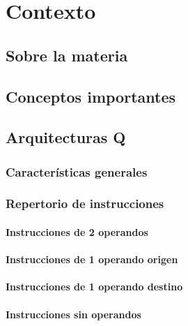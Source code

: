 \chapter{Contexto}
\section{Sobre la materia \orga}
\section{Conceptos importantes}

\section{Arquitecturas Q}

\subsection{Características generales} \label{caracteristicasQ}

\subsection{Repertorio de instrucciones}

\subsubsection{Instrucciones de 2 operandos}

\subsubsection{Instrucciones de 1 operando origen}
\subsubsection{Instrucciones de 1 operando destino}
\subsubsection{Instrucciones sin operandos}
